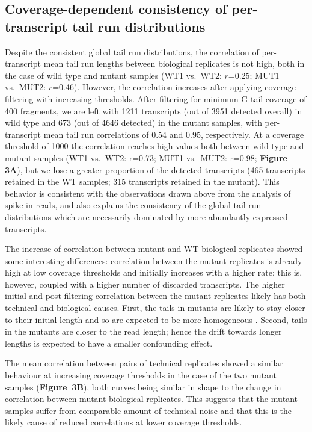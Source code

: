 \documentclass[10pt]{article}
\begin{document}
\subsection*{Coverage-dependent consistency of per-transcript tail run distributions}

Despite the consistent global tail run distributions, the correlation of per-transcript mean tail run lengths between biological replicates is not high, both in the case of wild type and mutant samples (WT1 vs.\ WT2: $r$=0.25; MUT1 vs.\ MUT2: $r$=0.46).
However, the correlation increases after applying coverage filtering with increasing thresholds. After filtering for minimum G-tail coverage of 400 fragments, we are left with 1211 transcripts (out of 3951 detected overall) in wild type and 673 (out of 4646 detected) in the mutant samples, with per-transcript mean tail run correlations of 0.54 and 0.95, respectively.
At a coverage threshold of 1000 the correlation reaches high values both between wild type and mutant samples (WT1 vs.\ WT2: r=0.73; MUT1 vs.\ MUT2: r=0.98; \textbf{Figure 3A}), but we lose a greater proportion of the detected transcripts (465 transcripts retained in the WT samples; 315 transcripts retained in the mutant). 
This behavior is consistent with the observations drawn above from the analysis of spike-in reads, and also explains the consistency of the global tail run distributions which are necessarily dominated by more abundantly expressed transcripts.


The increase of correlation between mutant and WT biological replicates showed some interesting differences: correlation between the mutant replicates is already high at low coverage thresholds and initially increases with a higher rate; this is, however, coupled with a higher number of discarded transcripts. The higher initial and post-filtering correlation between the mutant replicates likely has both technical and biological causes. First, the tails in mutants are likely to stay closer to their initial length and so are expected to be more homogeneous \cite{traven05,beilharz07}. Second, tails in the mutants are closer to the read length; hence the drift towards longer lengths is expected to have a smaller confounding effect.

The mean correlation between pairs of technical replicates showed a similar behaviour at increasing coverage thresholds in the case of the two mutant samples (\textbf{Figure~3B}), both curves being similar in shape to the change in correlation between mutant biological replicates. This suggests that the mutant samples suffer from comparable amount of technical noise and that this is the likely cause of reduced correlations at lower coverage thresholds.
\end{document}
